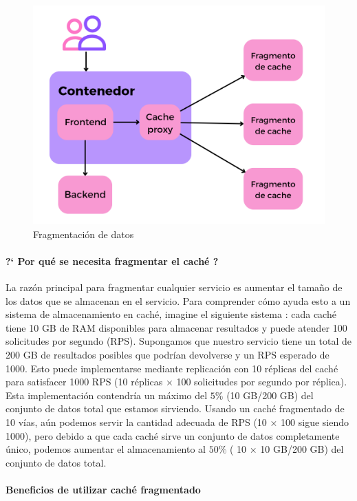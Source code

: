  \begin{figure}%
 	\includegraphics {9/7.png} 
 	\caption{Fragmentaci\'on de datos}
 	\label{fig:fragmen-cache}
 \end{figure}
  
  \paragraph{?` Por qu\'e se necesita fragmentar el caché ?}
  La razón principal para fragmentar cualquier servicio es aumentar el tamaño de los datos que se almacenan en el servicio.
   Para comprender cómo ayuda esto a un sistema de almacenamiento en caché, imagine el siguiente sistema \cite{Burns2018}: cada caché tiene 10 GB de RAM disponibles para almacenar resultados y puede atender 100 solicitudes por segundo (RPS). Supongamos   que nuestro servicio tiene un total de 200 GB de resultados posibles que podrían devolverse y un RPS esperado de 1000. Esto puede implementarse mediante  replicaci\'on con  10 réplicas del caché para satisfacer 1000 RPS (10 réplicas × 100 solicitudes por segundo por réplica). Esta implementaci\'on contendr\'ia  un máximo del $5\%$    (10 GB/200 GB) del conjunto de datos total que estamos sirviendo. 
   Usando un caché   fragmentado de 10 vías, aún podemos servir la cantidad adecuada de RPS (10 × 100 sigue siendo 1000), pero debido a que cada caché sirve un conjunto de datos completamente único, podemos aumentar el almacenamiento al $50\% $ ( 10 × 10 GB/200 GB) del conjunto de datos total. 
   
   \paragraph{Beneficios de utilizar caché fragmentado }
   
